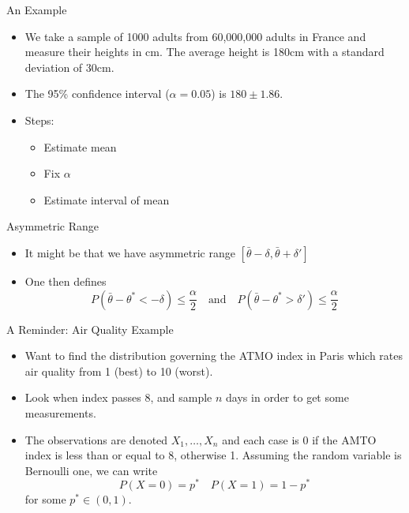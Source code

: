 \documentclass{beamer}
\begin{document}
\begin{frame}{An Example} 
\begin{itemize}
 \item We take a sample of 1000 adults from 60,000,000 adults in France and measure their heights in cm. The average height is 180cm with a standard deviation of 30cm. 
\item The 95\% confidence interval ($\alpha = 0.05$) is $180 \pm 1.86$.  
\item Steps: 
\begin{itemize}
\item Estimate mean 
\item Fix $\alpha$ 
\item Estimate interval of mean  
\end{itemize} 
\end{itemize}
\end{frame}

\begin{frame}{Asymmetric Range} 
\begin{itemize} 
 \item It might be that we have asymmetric range $[\bar{\theta} - \delta, \bar{\theta} + \delta']$
 \item One then defines 
\begin{displaymath} 
 P(\bar{\theta} - \theta^* < -\delta  ) \leq \frac{\alpha}{2} \quad \mbox{and} \quad P(\bar{\theta} - \theta^* > \delta') \leq \frac{\alpha}{2}
\end{displaymath}
\end{itemize}
\end{frame}
 
\begin{frame}{A Reminder: Air Quality Example} 
\begin{itemize}
 \item Want to find the distribution governing the ATMO index in Paris which rates air quality from 1 (best) to 10 (worst). 
 \item Look when index passes 8, and sample $n$ days in order to get some measurements. 
 \item The observations are denoted $X_1, \ldots, X_n$ and each case is 0 if the AMTO index is less than or equal to 8, otherwise 1. Assuming the random variable is Bernoulli one, we can write 
\begin{displaymath}
P(X = 0) = p^* \quad P(X = 1) = 1- p^*  
\end{displaymath}
for some $p^* \in (0, 1)$. 
\end{itemize}
\end{frame}
\end{document}
